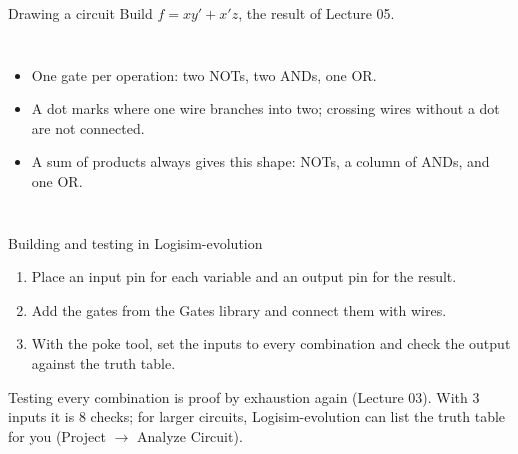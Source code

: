 \documentclass[10pt]{wosm-slides}
\begin{document}
\begin{frame}{Drawing a circuit}
  Build $f = xy' + x'z$, the result of Lecture 05.

  \medskip
  \begin{columns}[c, totalwidth=\textwidth]
      \centering
      \begin{itemize}
        \item One gate per operation: two NOTs, two ANDs, one OR.
        \item A dot marks where one wire branches into two; crossing wires without a
          dot are not connected.
        \item A sum of products always gives this shape: NOTs, a column of ANDs,
          and one OR.
      \end{itemize}
  \end{columns}
\end{frame}

\begin{frame}{Building and testing in Logisim-evolution}
  \begin{enumerate}
    \item Place an input pin for each variable and an output pin for the result.
    \item Add the gates from the Gates library and connect them with wires.
    \item With the poke tool, set the inputs to every combination and check the
      output against the truth table.
  \end{enumerate}

  \bigskip
  \begin{remark}
    Testing every combination is proof by exhaustion again (Lecture 03). With 3
    inputs it is 8 checks; for larger circuits, Logisim-evolution can list the truth
    table for you (Project $\rightarrow$ Analyze Circuit).
  \end{remark}
\end{frame}
\end{document}
